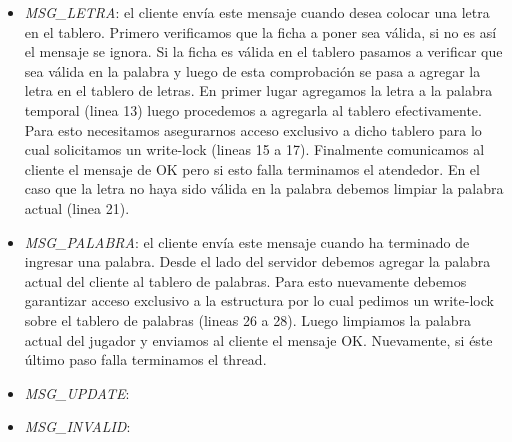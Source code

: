 \documentclass[a4paper,11pt]{article}
\begin{document}
	\begin{itemize}
		\item \emph{MSG\_LETRA}: el cliente envía este mensaje cuando desea colocar una letra en el tablero. Primero verificamos que la ficha a poner sea válida, si no es así el mensaje se ignora. Si la ficha es válida en el tablero pasamos a verificar que sea válida en la palabra y luego de esta comprobación se pasa a agregar la letra en el tablero de letras. En primer lugar agregamos la letra a la palabra temporal (linea 13) luego procedemos a agregarla al tablero efectivamente. Para esto necesitamos asegurarnos acceso exclusivo a dicho tablero para lo cual solicitamos un write-lock (lineas 15 a 17). Finalmente comunicamos al cliente el mensaje de OK pero si esto falla terminamos el atendedor. En el caso que la letra no haya sido válida en la palabra debemos limpiar la palabra actual (linea 21).
		
		\item \emph{MSG\_PALABRA}: el cliente envía este mensaje cuando ha terminado de ingresar una palabra. Desde el lado del servidor debemos agregar la palabra actual del cliente al tablero de palabras. Para esto nuevamente debemos garantizar acceso exclusivo a la estructura por lo cual pedimos un write-lock sobre el tablero de palabras (lineas 26 a 28). Luego limpiamos la palabra actual del jugador y enviamos al cliente el mensaje OK. Nuevamente, si éste último paso falla terminamos el thread.
		
		\item \emph{MSG\_UPDATE}:
		
		\item \emph{MSG\_INVALID}:
	\end{itemize}
	
\end{document}
